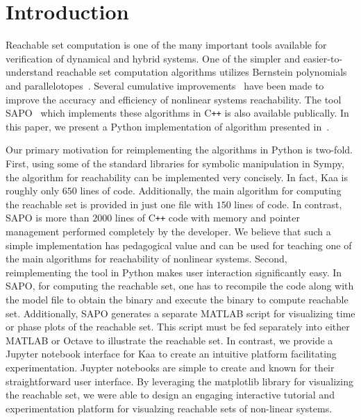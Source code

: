 \documentclass[EPiC]{easychair}
\begin{document}
%
%
%
\section{Introduction}

Reachable set computation is one of the many important tools available for verification of dynamical and hybrid systems.
%
One of the simpler and easier-to-understand reachable set computation algorithms utilizes Bernstein polynomials and parallelotopes~\cite{dang2009image}.
%
Several cumulative improvements~\cite{dang2012reachability,sassi2012reachability,dang2014parameter,dreossi2016parallelotope,dreossi2017reachability} have been made to improve the accuracy and efficiency of nonlinear systems reachability.
%
The tool SAPO~\cite{dreossi2017sapo} which implements these algorithms in C\texttt{++} is also available publically.
%
In this paper, we present a Python implementation of algorithm presented in~\cite{dreossi2017reachability}.

%
Our primary motivation for reimplementing the algorithms in Python is two-fold.
%
First, using some of the standard libraries for symbolic manipulation in Sympy, the algorithm for reachability can be implemented very concisely.
%
In fact, Kaa is roughly only $650$ lines of code.
%
Additionally, the main algorithm for computing the reachable set is provided in just one file with $150$ lines of code.
%
In contrast, SAPO is more than $2000$ lines of C\texttt{++} code with memory and pointer management performed completely by the developer.
%
We believe that such a simple implementation has pedagogical value and can be used for teaching one of the main algorithms for reachability of nonlinear systems.
%
Second, reimplementing the tool in Python makes user interaction significantly easy. 
%
In SAPO, for computing the reachable set, one has to recompile the code along with the model file to obtain the binary and execute the binary to compute reachable set.
%
Additionally, SAPO generates a separate MATLAB script for visualizing time or phase plots of the reachable set. This script must be fed separately into either MATLAB or Octave to illustrate the reachable set. 
%
In contrast, we provide a Jupyter notebook interface for Kaa to create an intuitive platform facilitating experimentation. Juypter notebooks are simple to create and known for their straightforward user interface. By leveraging the matplotlib library for visualizing the reachable set, we were able to design an engaging interactive tutorial and experimentation platform for visualzing reachable sets of non-linear systems.
%
%
\end{document}
